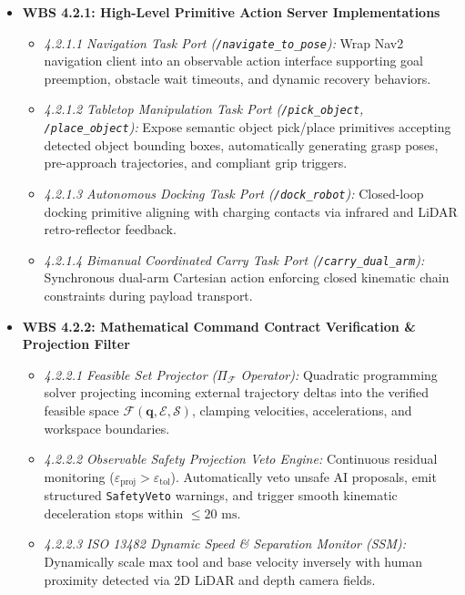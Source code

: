 \documentclass[10pt,a4paper]{article}
\begin{document}
\begin{itemize}[leftmargin=1.5em]
    \item \textbf{WBS 4.2.1: High-Level Primitive Action Server Implementations}
    \begin{itemize}[leftmargin=1.2em]
        \item \emph{4.2.1.1 Navigation Task Port (\texttt{/navigate\_to\_pose}):} Wrap Nav2 navigation client into an observable action interface supporting goal preemption, obstacle wait timeouts, and dynamic recovery behaviors.
        \item \emph{4.2.1.2 Tabletop Manipulation Task Port (\texttt{/pick\_object}, \texttt{/place\_object}):} Expose semantic object pick/place primitives accepting detected object bounding boxes, automatically generating grasp poses, pre-approach trajectories, and compliant grip triggers.
        \item \emph{4.2.1.3 Autonomous Docking Task Port (\texttt{/dock\_robot}):} Closed-loop docking primitive aligning with charging contacts via infrared and LiDAR retro-reflector feedback.
        \item \emph{4.2.1.4 Bimanual Coordinated Carry Task Port (\texttt{/carry\_dual\_arm}):} Synchronous dual-arm Cartesian action enforcing closed kinematic chain constraints during payload transport.
    \end{itemize}

    \item \textbf{WBS 4.2.2: Mathematical Command Contract Verification \& Projection Filter}
    \begin{itemize}[leftmargin=1.2em]
        \item \emph{4.2.2.1 Feasible Set Projector ($\Pi_{\mathcal{F}}$ Operator):} Quadratic programming solver projecting incoming external trajectory deltas into the verified feasible space $\mathcal{F}(\mathbf{q}, \mathcal{E}, \mathcal{S})$, clamping velocities, accelerations, and workspace boundaries.
        \item \emph{4.2.2.2 Observable Safety Projection Veto Engine:} Continuous residual monitoring ($\varepsilon_{\text{proj}} > \varepsilon_{\text{tol}}$). Automatically veto unsafe AI proposals, emit structured \texttt{SafetyVeto} warnings, and trigger smooth kinematic deceleration stops within $\le 20\text{ ms}$.
        \item \emph{4.2.2.3 ISO 13482 Dynamic Speed \& Separation Monitor (SSM):} Dynamically scale max tool and base velocity inversely with human proximity detected via 2D LiDAR and depth camera fields.
    \end{itemize}


\end{itemize}
\end{document}
